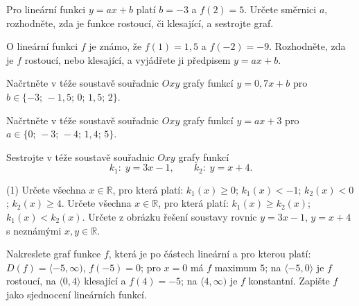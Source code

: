 \documentclass[12pt,a4paper]{article}
\begin{document}
\begin{exercise}
    Pro lineární funkci $y=ax+b$ platí $b=-3$ a $f(2)=5$. Určete směrnici $a$, rozhodněte, zda je funkce rostoucí, či klesající, a sestrojte graf.
\end{exercise}


\newpage
\begin{exercise}
    O lineární funkci $f$ je známo, že $f(1)=1{,}5$ a $f(-2)=-9$. Rozhodněte, zda je $f$ rostoucí, nebo klesající, a vyjádřete ji předpisem $y=ax+b$.
\end{exercise}


\begin{exercise}
    Načrtněte v téže soustavě souřadnic $Oxy$ grafy funkcí $y=0{,}7x+b$ pro $b\in\{-3;\,-1{,}5;\,0;\,1{,}5;\,2\}$.
\end{exercise}


\begin{exercise}
    Načrtněte v téže soustavě souřadnic $Oxy$ grafy funkcí $y=ax+3$ pro $a\in\{0;\,-3;\,-4;\,1{,}4;\,5\}$.
\end{exercise}


\begin{exercise}
    Sestrojte v téže soustavě souřadnic $Oxy$ grafy funkcí
    \[
        k_1:\; y=3x-1,\qquad k_2:\; y=x+4.
    \]
    \begin{tasks}(1)
        \task Určete všechna $x\in\mathbb{R}$, pro která platí: $k_1(x)\ge 0$;\; $k_1(x)<-1$;\; $k_2(x)<0$;\; $k_2(x)\ge 4$.
        \task Určete všechna $x\in\mathbb{R}$, pro která platí: $k_1(x)\ge k_2(x)$;\; $k_1(x)<k_2(x)$.
        \task Určete z obrázku řešení soustavy rovnic $y=3x-1$,\; $y=x+4$ s neznámými $x,y\in\mathbb{R}$.
    \end{tasks}
\end{exercise}


\begin{exercise}
    Nakreslete graf funkce $f$, která je po částech lineární a pro kterou platí: 
    $D(f)=\langle -5,\infty)$, $f(-5)=0$; 
    pro $x=0$ má $f$ maximum $5$; 
    na $\langle -5,0\rangle$ je $f$ rostoucí, na $\langle 0,4\rangle$ klesající a $f(4)=-5$; 
    na $\langle 4,\infty)$ je $f$ konstantní.  
    Zapište $f$ jako sjednocení lineárních funkcí.
\end{exercise}
\end{document}
